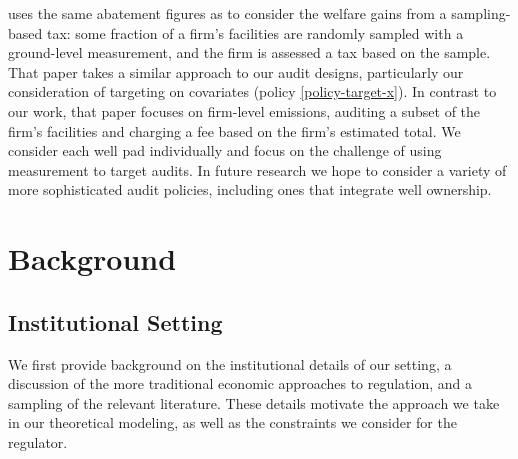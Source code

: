 \documentclass[12pt,oneside,letterpaper]{article}
\theoremstyle{definition}
\begin{document}
\begin{refsection}
\textcite{Marks:2019} uses the same abatement figures as \textcite{Marks:2021} to consider the welfare gains from a sampling-based tax: some fraction of a firm's facilities are randomly sampled with a ground-level measurement, and the firm is assessed a tax based on the sample.
That paper takes a similar approach to our audit designs, particularly our consideration of targeting on covariates (policy \ref{policy-target-x}).
In contrast to our work, that paper focuses on firm-level emissions, auditing a subset of the firm's facilities and charging a fee based on the firm's estimated total.
We consider each well pad individually and focus on the challenge of using measurement to target audits.
In future research we hope to consider a variety of more sophisticated audit policies, including ones that integrate well ownership.


\section{Background}
\label{sec:background}

\subsection{Institutional Setting}
\label{sec:institutional-setting}

We first provide background on the institutional details of our setting, a discussion of the more traditional economic approaches to regulation, and a sampling of the relevant literature.
These details motivate the approach we take in our theoretical modeling, as well as the constraints we consider for the regulator.


\end{refsection}
\end{document}
